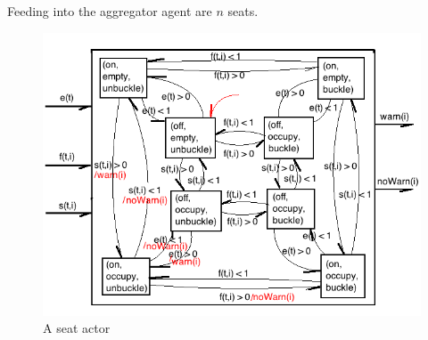 \documentclass{article}
\begin{document}
Feeding into the aggregator agent are $n$ seats.


\begin{figure}[h!]
\centering
\includegraphics[scale=0.7]{hw7_4b_actor_seat.png}
\caption{A seat actor}
\label{fig:4b_actor_seat}
\end{figure}
\end{document}
